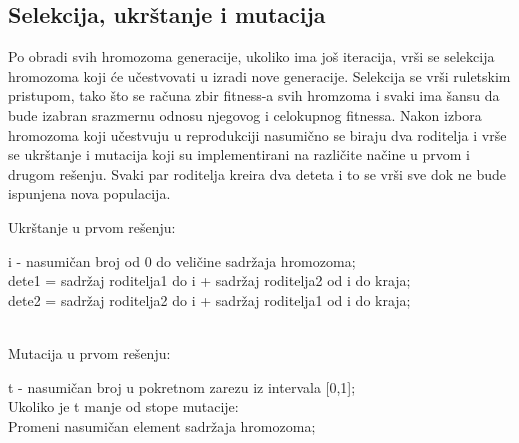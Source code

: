 \documentclass[a4paper]{article}
\begin{document}
\subsection{Selekcija, ukrštanje i mutacija}
\par Po obradi svih hromozoma generacije, ukoliko ima još iteracija, vrši se selekcija hromozoma koji će učestvovati u izradi nove generacije. Selekcija se vrši ruletskim pristupom, tako što se računa zbir fitness-a svih hromzoma i svaki ima šansu da bude izabran srazmernu odnosu njegovog i celokupnog fitnessa. Nakon izbora hromozoma koji učestvuju u reprodukciji nasumično se biraju dva roditelja i vrše se ukrštanje i mutacija koji su implementirani na različite načine u prvom i drugom rešenju. Svaki par roditelja kreira dva deteta i to se vrši sve dok ne bude ispunjena nova populacija. 
\begin{tcolorbox}
\begin{center}
Ukrštanje u prvom rešenju: \\
\end{center}
i - nasumičan broj od 0 do veličine sadržaja hromozoma;\\
dete1 = sadržaj roditelja1 do i + sadržaj roditelja2 od i do kraja; \\
dete2 = sadržaj roditelja2 do i + sadržaj roditelja1 od  i do kraja; \\~ \\
\begin{center}
Mutacija u prvom rešenju:  \\
\end{center}
t - nasumičan broj u pokretnom zarezu iz intervala [0,1];\\
Ukoliko je t manje od stope mutacije: \\
\hphantom{tcolorbox}Promeni nasumičan element sadržaja hromozoma;
\end{tcolorbox}
\end{document}
